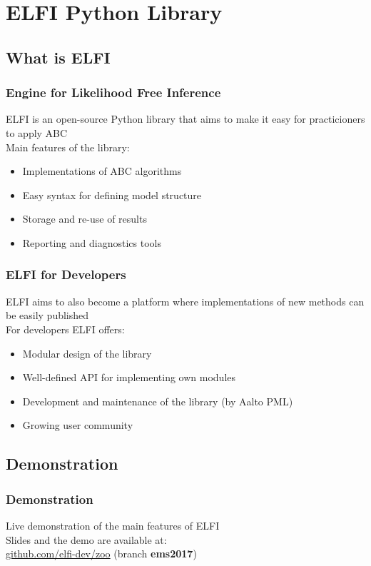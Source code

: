 \documentclass{beamer}
\begin{document}

\section{ELFI Python Library}

\subsection{What is ELFI}

\begin{frame}
\frametitle{Engine for Likelihood Free Inference}
ELFI is an open-source Python library that aims to make it easy for practicioners to apply ABC\\
\medskip
Main features of the library:
\begin{itemize}
\item Implementations of ABC algorithms
\item Easy syntax for defining model structure
\item Storage and re-use of results
\item Reporting and diagnostics tools
\end{itemize}
\end{frame}

\begin{frame}
\frametitle{ELFI for Developers}
ELFI aims to also become a platform where implementations of new methods can be easily published\\
\medskip
For developers ELFI offers:
\begin{itemize}
\item Modular design of the library
\item Well-defined API for implementing own modules
\item Development and maintenance of the library (by Aalto PML)
\item Growing user community
\end{itemize}
\end{frame}

\subsection{Demonstration}

\begin{frame}
\frametitle{Demonstration}
Live demonstration of the main features of ELFI\\
\medskip
Slides and the demo are available at:\\
\url{github.com/elfi-dev/zoo} (branch \textbf{ems2017})
\end{frame}
\end{document}
